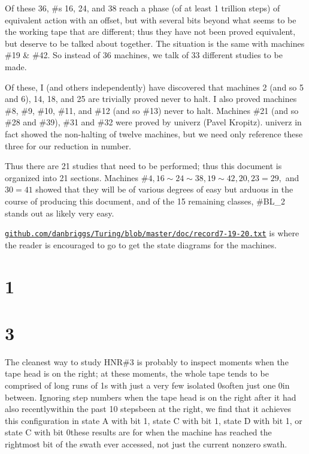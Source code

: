 \documentclass[12pt]{article}
\begin{document}
Of these 36, \#s 16, 24, and 38 reach a phase (of at least 1 trillion steps) of equivalent action with an offset, but with several bits beyond what seems to be the working tape that are different; thus they have not been proved equivalent, but deserve to be talked about together. The situation is the same with machines \#19 \& \#42. So instead of 36 machines, we talk of 33 different studies to be made.

Of these, I (and others independently) have discovered that machines 2 (and so 5 and 6), 14, 18, and 25 are trivially proved never to halt. I also proved machines \#8, \#9, \#10, \#11, and \#12 (and so \#13) never to halt. Machines \#21 (and so \#28 and \#39), \#31 and \#32 were proved by univerz (Pavel Kropitz). univerz in fact showed the non-halting of twelve machines, but we need only reference these three for our reduction in number.

Thus there are 21 studies that need to be performed; thus this document is organized into 21 sections.
Machines \#$4, 16\sim24\sim38, 19\sim42, 20, 23=29,$ and $30=41$ showed that they will be of various
degrees of easy but arduous in the course of producing this document, and of the 15 remaining classes,
\#BL\_2 stands out as likely very easy.

\texttt{\href{https://github.com/danbriggs/Turing/blob/master/doc/record7-19-20.txt}
{github.com/danbriggs/Turing/blob/master/doc/record7-19-20.txt}}
is where the reader is encouraged to go to get the state diagrams for the machines.

\newpage
\tableofcontents
\clearpage
{}
{}
\section*{1}
\clearpage
{}
{}
\section*{3}
The cleanest way to study HNR\#3 is probably to inspect moments when the tape head is on the right; at these moments, the whole tape tends to be comprised of long runs of 1s with just a very few isolated 0s\textemdash often just one 0\textemdash in between. Ignoring step numbers when the tape head is on the right after it had also recently\textemdash within the past 10 steps\textemdash been at the right, we find that it achieves this configuration in state A with bit 1, state C with bit 1, state D with bit 1, or state C with bit 0\textemdash these results are for when the machine has reached the rightmost bit of the swath ever accessed, not just the current nonzero swath.
\end{document}
